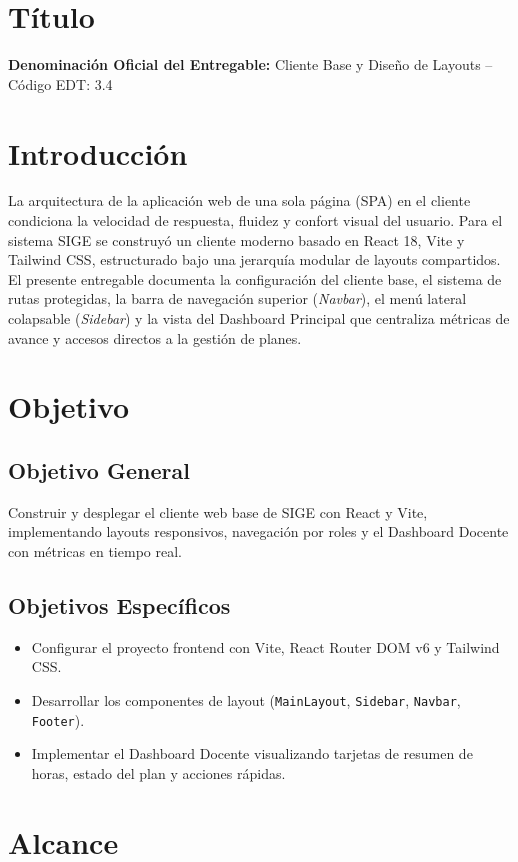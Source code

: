 \documentclass[12pt,a4paper]{article}
\begin{document}
\section{Título}
\textbf{Denominación Oficial del Entregable:} Cliente Base y Diseño de Layouts -- Código EDT: 3.4

\section{Introducción}
La arquitectura de la aplicación web de una sola página (SPA) en el cliente condiciona la velocidad de respuesta, fluidez y confort visual del usuario. Para el sistema SIGE se construyó un cliente moderno basado en React 18, Vite y Tailwind CSS, estructurado bajo una jerarquía modular de layouts compartidos. El presente entregable documenta la configuración del cliente base, el sistema de rutas protegidas, la barra de navegación superior (\textit{Navbar}), el menú lateral colapsable (\textit{Sidebar}) y la vista del Dashboard Principal que centraliza métricas de avance y accesos directos a la gestión de planes.

\section{Objetivo}
\subsection{Objetivo General}
Construir y desplegar el cliente web base de SIGE con React y Vite, implementando layouts responsivos, navegación por roles y el Dashboard Docente con métricas en tiempo real.
\subsection{Objetivos Específicos}
\begin{itemize}[leftmargin=1.5em, itemsep=2pt]
    \item Configurar el proyecto frontend con Vite, React Router DOM v6 y Tailwind CSS.
    \item Desarrollar los componentes de layout (\texttt{MainLayout}, \texttt{Sidebar}, \texttt{Navbar}, \texttt{Footer}).
    \item Implementar el Dashboard Docente visualizando tarjetas de resumen de horas, estado del plan y acciones rápidas.
\end{itemize}

\section{Alcance}
\end{document}
